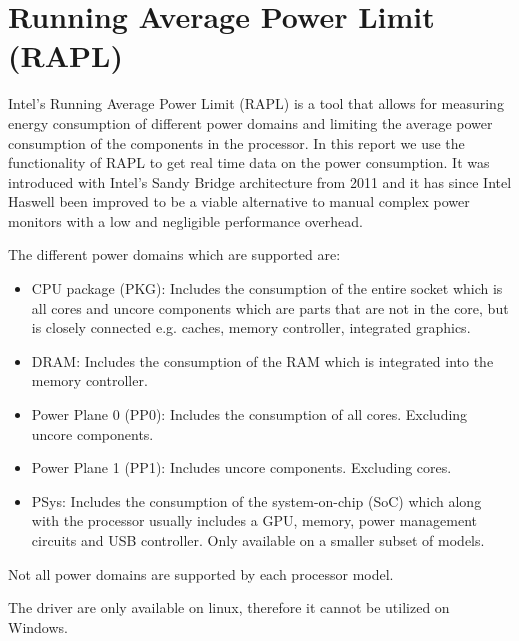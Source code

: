 \section{Running Average Power Limit (RAPL)}
Intel's Running Average Power Limit (RAPL) is a tool that allows for measuring energy consumption of different power domains and limiting the average power consumption of the components in the processor. In this report we use the functionality of RAPL to get real time data on the power consumption. It was introduced with Intel’s Sandy Bridge architecture from 2011 and it has since Intel Haswell been improved to be a viable alternative to manual complex power monitors with a low and negligible performance overhead. \cite{RAPL_in_action}

The different power domains which are supported are:
\begin{itemize}
    \item CPU package (PKG): Includes the consumption of the entire socket which is all cores and uncore components which are parts that are not in the core, but is closely connected e.g. caches, memory controller, integrated graphics.
    \item DRAM: Includes the consumption of the RAM which is integrated into the memory controller.  
    \item Power Plane 0 (PP0): Includes the consumption of all cores. Excluding uncore components.
    \item Power Plane 1 (PP1): Includes uncore components. Excluding cores.
    \item PSys: Includes the consumption of the system-on-chip (SoC) which along with the processor usually includes a GPU, memory, power management circuits and USB controller. Only available on a smaller subset of models.
\end{itemize}
Not all power domains are supported by each processor model.

The driver are only available on linux, therefore it cannot be utilized on Windows. 